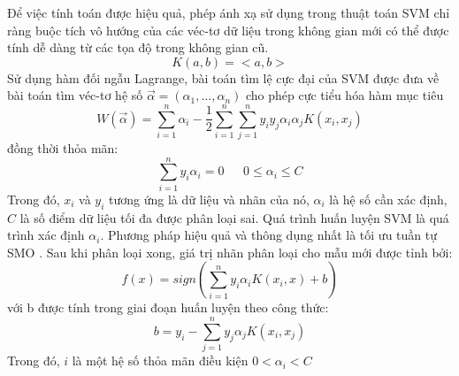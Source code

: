 Để việc tính toán được hiệu quả, phép ánh xạ sử dụng trong thuật toán SVM chỉ ràng
buộc tích vô hướng của các véc-tơ dữ liệu trong không gian mới có thể được tính dễ
dàng từ các tọa độ trong không gian cũ.
\begin{equation}
    K(a,b)=<a,b>
\end{equation}
Sử dụng hàm đối ngẫu Lagrange, bài toán tìm lệ cực đại của SVM được đưa về bài
toán tìm véc-tơ hệ số $\vec{\alpha}=(\alpha_1, ..., \alpha_n)$ cho phép cực tiểu hóa hàm mục tiêu
\begin{equation}
    W(\vec{\alpha}) = \sum_{i=1}^n \alpha_i - \frac{1}{2}\sum_{i=1}^{n}\sum_{j=1}^{n}y_i y_j \alpha_i \alpha_j K(x_i, x_j)
\end{equation}
đồng thời thỏa mãn:
\begin{equation}
    \sum_{i=1}^{n}y_i \alpha_i = 0 ~~~~~~~ 0\leq\alpha_i\leq C
\end{equation}
Trong đó, $x_i$ và $y_i$ tương ứng là dữ liệu và nhãn của nó, $\alpha_i$ là hệ số cần xác định, 
$C$ là số điểm dữ liệu tối đa được phân loại sai. Quá trình huấn luyện SVM là quá trình xác 
định $\alpha_i$. Phương pháp hiệu quả và thông dụng nhất là tối ưu tuần tự SMO \cite{platt1998sequential}. 
Sau khi phân loại xong, giá trị nhãn phân loại cho mẫu mới được tỉnh bởi:
\begin{equation}
    f(x)=sign(\sum_{i=1}^{n}y_i \alpha_i K(x_i, x) + b )
\end{equation}
với b được tính trong giai đoạn huấn luyện theo công thức:
\begin{equation}
    b=y_i-\sum_{j=1}^{n}y_j \alpha_j K(x_i, x_j)
\end{equation}
Trong đó, $i$ là một hệ số thỏa mãn điều kiện $0<\alpha_i<C$

